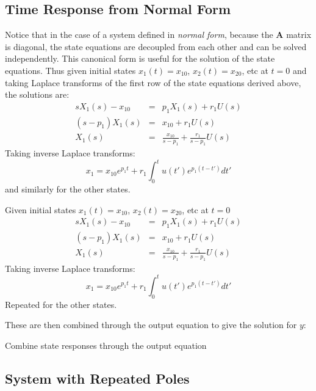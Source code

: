 \subsection*{Time Response from Normal Form}

Notice that in the case of a system defined in \emph{normal form}, because the $\mathbf{A}$ matrix is diagonal, the state equations are decoupled from each other and can be solved independently. This canonical form is useful for the solution of the state equations. Thus given initial states $x_1(t)=x_{10}$, $x_2(t)=x_{20}$, etc at $t=0$ and taking Laplace transforms of the first row of the state equations derived above, the solutions are:
\begin{eqnarray*}
 sX_1 (s) - x_{10}  & = & p_1 X_1 (s) + r_1 U(s) \\ 
 (s - p_1 )X_1 (s) & = & x_{10}  + r_1 U(s) \\ 
 X_1 (s) & = & \frac{{x_{10} }}{{s - p_1 }} + \frac{{r_1 }}{{s - p_1 }}U(s)
\end{eqnarray*}
Taking inverse Laplace transforms:
\[ x_1 = x_{10}e^{p_1t}+r_1\int_0^tu(t')e^{p_1(t-t')}dt' \]
and similarly for the other states.
\ifslidesonly
\begin{slide}
	Given initial states $x_1(t)=x_{10}$, $x_2(t)=x_{20}$, etc at $t=0$
	\begin{eqnarray*}
	 sX_1 (s) - x_{10}  & = & p_1 X_1 (s) + r_1 U(s) \\ 
	 (s - p_1 )X_1 (s) & = & x_{10}  + r_1 U(s) \\ 
	 X_1 (s) & = & \frac{{x_{10} }}{{s - p_1 }} + \frac{{r_1 }}{{s - p_1 }}U(s)
	\end{eqnarray*}
	Taking inverse Laplace transforms:
	\[ x_1 = x_{10}e^{p_1t}+r_1\int_0^tu(t')e^{p_1(t-t')}dt' \]
	Repeated for the other states.
\end{slide}
\fi

These are then combined through the output equation to give the solution for $y$:

\ifslidesonly
\begin{slide}
	Combine state responses through the output equation
	
\end{slide}
\fi

\subsection*{System with Repeated Poles}

